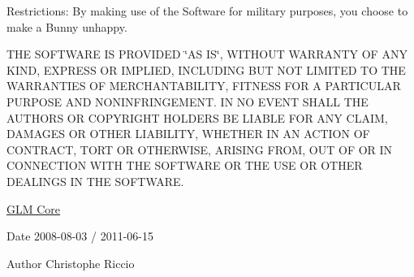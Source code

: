 Restrictions\-: By making use of the Software for military purposes, you choose to make a Bunny unhappy.

T\-H\-E S\-O\-F\-T\-W\-A\-R\-E I\-S P\-R\-O\-V\-I\-D\-E\-D \char`\"{}\-A\-S I\-S\char`\"{}, W\-I\-T\-H\-O\-U\-T W\-A\-R\-R\-A\-N\-T\-Y O\-F A\-N\-Y K\-I\-N\-D, E\-X\-P\-R\-E\-S\-S O\-R I\-M\-P\-L\-I\-E\-D, I\-N\-C\-L\-U\-D\-I\-N\-G B\-U\-T N\-O\-T L\-I\-M\-I\-T\-E\-D T\-O T\-H\-E W\-A\-R\-R\-A\-N\-T\-I\-E\-S O\-F M\-E\-R\-C\-H\-A\-N\-T\-A\-B\-I\-L\-I\-T\-Y, F\-I\-T\-N\-E\-S\-S F\-O\-R A P\-A\-R\-T\-I\-C\-U\-L\-A\-R P\-U\-R\-P\-O\-S\-E A\-N\-D N\-O\-N\-I\-N\-F\-R\-I\-N\-G\-E\-M\-E\-N\-T. I\-N N\-O E\-V\-E\-N\-T S\-H\-A\-L\-L T\-H\-E A\-U\-T\-H\-O\-R\-S O\-R C\-O\-P\-Y\-R\-I\-G\-H\-T H\-O\-L\-D\-E\-R\-S B\-E L\-I\-A\-B\-L\-E F\-O\-R A\-N\-Y C\-L\-A\-I\-M, D\-A\-M\-A\-G\-E\-S O\-R O\-T\-H\-E\-R L\-I\-A\-B\-I\-L\-I\-T\-Y, W\-H\-E\-T\-H\-E\-R I\-N A\-N A\-C\-T\-I\-O\-N O\-F C\-O\-N\-T\-R\-A\-C\-T, T\-O\-R\-T O\-R O\-T\-H\-E\-R\-W\-I\-S\-E, A\-R\-I\-S\-I\-N\-G F\-R\-O\-M, O\-U\-T O\-F O\-R I\-N C\-O\-N\-N\-E\-C\-T\-I\-O\-N W\-I\-T\-H T\-H\-E S\-O\-F\-T\-W\-A\-R\-E O\-R T\-H\-E U\-S\-E O\-R O\-T\-H\-E\-R D\-E\-A\-L\-I\-N\-G\-S I\-N T\-H\-E S\-O\-F\-T\-W\-A\-R\-E.

\hyperlink{group__core}{G\-L\-M Core}

\begin{DoxyDate}{Date}
2008-\/08-\/03 / 2011-\/06-\/15 
\end{DoxyDate}
\begin{DoxyAuthor}{Author}
Christophe Riccio 
\end{DoxyAuthor}
